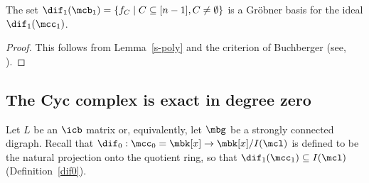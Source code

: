 \begin{proposition}\label{GB1}
The set $\dif_1(\mcb_1)=\{f_C\mid C\subseteq [n-1],
C\neq\emptyset\}$ is a Gr\"obner basis for the ideal
$\dif_1(\mcc_1)$.
\end{proposition}
\begin{proof}
This follows from Lemma~\ref{s-poly} and the criterion of Buchberger
(see, \eg \cite[\S~2.6, Theorem~6 and \S~2.9, Theorem~3]{clo}).
\end{proof}

\subsection{The Cyc complex is exact in degree zero}\label{exact-degree0}

 Let $L$ be an $\icb$ matrix or, equivalently, let $\mbg$ be
a strongly connected digraph.  Recall that $\dif_0:\mcc_0=\mbk[x]\to
\mbk[x]/I(\mcl)$ is defined to be the natural projection onto the
quotient ring, so that $\dif_1(\mcc_1)\subseteq I(\mcl)$
(Definition~\ref{dif0}).

